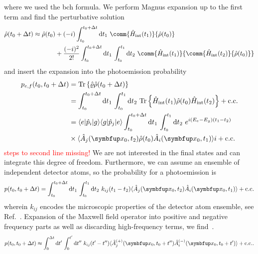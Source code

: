 where we used the \gls{bch} formula.
We perform Magnus expansion up to the first term and find the perturbative solution
\begin{equation}
	\begin{split}
		\hat\rho(t_0+\Delta t)
		\approx
		\hat\rho(t_0)
		&+
		(-i)
		\int_{t_0}^{t_0+\Delta t}\dd{t_1}
		\comm{\hat{H}_\text{int}(t_1)}{\hat\rho(t_0)}
		\\
		&+
		\frac{(-i)^2}{2!}
		\int_{t_0}^{t_0+\Delta t}\dd{t_1}
		\int_{t_0}^{t_1}\dd{t_2}
		\comm{\hat{H}_\text{int}(t_1)}{\comm{\hat{H}_\text{int}(t_2)}{\hat\rho(t_0)}}
	\end{split}	
\end{equation}
and insert the expansion into the photoemission probability
\begin{equation}
	\begin{split}
		p_{e,f}(t_0,t_0+\Delta t)
		&=
		\trace\left\{
			\hat\varrho
			\hat\rho(t_0+\Delta t)
		\right\}
		\\
		&=
		\int_{t_0}^{t_0+\Delta t}\dd{t_1}
		\int_{t_0}^{t_1}\dd{t_2}
		\trace\left\{
			\hat{H}_\text{int}(t_1)
			\hat\rho(t_0)
			\hat{H}_\text{int}(t_2)
		\right\}
		+
		\text{c.c.}
		\\
		&=
		\bra{e}\hat{p}_i\ket{g}
		\bra{g}\hat{p}_j\ket{e}
		\int_{t_0}^{t_0+\Delta t}\dd{t_1}
		\int_{t_0}^{t_1}\dd{t_2}
		e^{i(E_e-E_g)(t_1-t_2)}
		\\
		&\times
		\expval{
			\hat{A}_j(\vb{x}_0,t_2)
			\hat\rho(t_0)
			\hat{A}_i(\vb{x}_0,t_1)
		}{i}
		+
		\text{c.c.}
	\end{split}
\end{equation}
\textcolor{red}{steps to second line missing!}
We are not interested in the final states and can integrate this degree of freedom.
Furthermore, we can assume an ensemble of independent detector atoms, so the probability for a photoemission is
\begin{equation}
	p(t_0,t_0+\Delta t)
	=
	\int_{t_0}^{t_0+\Delta t}\dd{t_1}
	\int_{t_0}^{t_1}\dd{t_2}
	k_{ij}(t_1-t_2)
	\expval{
		\hat{A}_j(\vb{x}_0,t_2)
		\hat{A}_i(\vb{x}_0,t_1)
	}
	+
	\text{c.c.}
\end{equation}
wherein $k_{ij}$ encodes the microscopic properties of the detector atom ensemble, see Ref.~\cite[p.~694]{Mandel1995}.
Expansion of the Maxwell field operator into positive and negative frequency parts as well as discarding high-frequency terms, we find~\cite[p.~698]{Mandel1995}.
\begin{equation}
	p(t_0,t_0+\Delta t)
	\approx
	\int_0^{\Delta t}\dd{t^\prime}
	\int_0^{t^\prime}\dd{t^{\prime\prime}}
	k_{ij}(t^{\prime}-t^{\prime\prime})
	\expval{
		\hat{A}_j^{(+)}(\vb{x}_0,t_0+t^{\prime\prime})
		\hat{A}_i^{(-)}(\vb{x}_0,t_0+t^{\prime})
	}
	+
	\text{c.c.}
	.
\end{equation}
